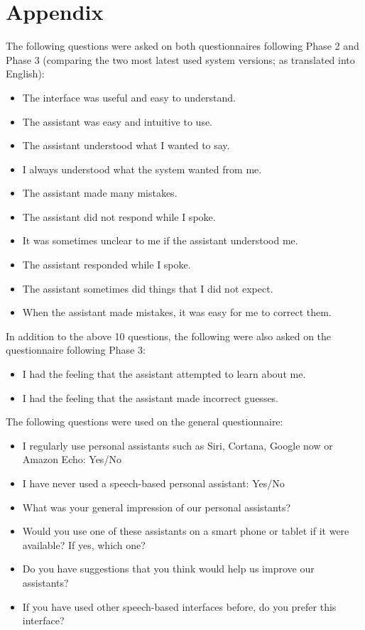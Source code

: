 \documentclass[11pt]{article}
\begin{document}
\section*{Appendix}

{\small
\noindent
The following questions were asked on both questionnaires following Phase 2 and Phase 3 (comparing the two most latest used system versions; as translated into English):
\begin{itemize}
 \item The interface was useful and easy to understand.
 \item The assistant was easy and intuitive to use.
 \item The assistant understood what I wanted to say.
 \item I always understood what the system wanted from me. 
 \item The assistant made many mistakes. 
 \item The assistant did not respond while I spoke.
 \item It was sometimes unclear to me if the assistant understood me. 
 \item The assistant responded while I spoke. 
 \item The assistant sometimes did things that I did not expect.
 \item When the assistant made mistakes, it was easy for me to correct them. 
\end{itemize}

\noindent
In addition to the above 10 questions, the following were also asked on the questionnaire following Phase 3:
\begin{itemize}
 \item I had the feeling that the assistant attempted to learn about me.
 \item I had the feeling that the assistant made incorrect guesses. 
\end{itemize}

\noindent
The following questions were used on the general questionnaire:
\begin{itemize}
 \item I regularly use personal assistants such as Siri, Cortana, Google now or Amazon Echo: Yes/No
 \item I have never used a speech-based personal assistant: Yes/No
 \item What was your general impression of our personal assistants?
 \item Would you use one of these assistants on a smart phone or tablet if it were available? If yes, which one?
 \item Do you have suggestions that you think would help us improve our assistants?
 \item If you have used other speech-based interfaces before, do you prefer this interface?
\end{itemize}
}




\end{document}
